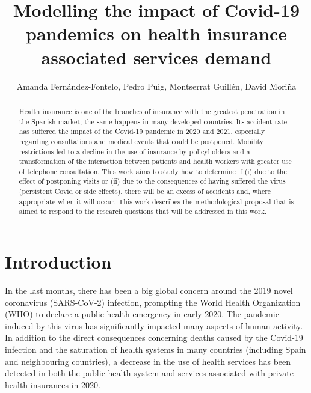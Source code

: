 \documentclass[Afour,sageh,times]{sagej}
\begin{document}

\title{Modelling the impact of Covid-19 pandemics on health insurance associated services demand}

\author{Amanda Fern\'andez-Fontelo, Pedro Puig, Montserrat Guill\'en, David Mori\~na}




\begin{abstract}
Health insurance is one of the branches of insurance with the greatest penetration in the Spanish market; the same happens in many developed countries. Its accident rate has suffered the impact of the Covid-19 pandemic in 2020 and 2021, especially regarding consultations and medical events that could be postponed. Mobility restrictions led to a decline in the use of insurance by policyholders and a transformation of the interaction between patients and health workers with greater use of telephone consultation. This work aims to study how to determine if (i) due to the effect of postponing visits or (ii) due to the consequences of having suffered the virus (persistent Covid or side effects), there will be an excess of accidents and, where appropriate when it will occur. This work describes the methodological proposal that is aimed to respond to the research questions that will be addressed in this work.
\end{abstract}

\keywords{}

\maketitle

\section{Introduction}

In the last months, there has been a big global concern around the 2019 novel coronavirus (SARS-CoV-2) infection, prompting the World Health Organization (WHO) to declare a public health emergency in early 2020. The pandemic induced by this virus has significantly impacted many aspects of human activity. In addition to the direct consequences concerning deaths caused by the Covid-19 infection and the saturation of health systems in many countries (including Spain and neighbouring countries), a decrease in the use of health services has been detected in both the public health system and services associated with private health insurances in 2020. 
\end{document}
